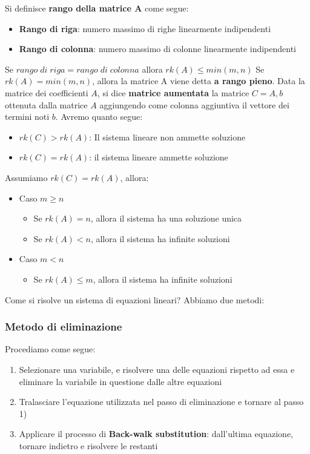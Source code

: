 \documentclass[12pt]{article}
\begin{document}
Si definisce \textbf{rango della matrice A} come segue:
\begin{itemize}
    \item \textbf{Rango di riga}: numero massimo di righe linearmente indipendenti
    \item \textbf{Rango di colonna}: numero massimo di colonne linearmente indipendenti
\end{itemize}
Se $rango \; di \; riga = rango \; di \; colonna$ allora $rk(A) \leq min(m, n)$ \newline
Se $rk(A) = min (m, n)$, allora la matrice A viene detta \textbf{a rango pieno}. \newline
Data la matrice dei coefficienti $A$, si dice \textbf{matrice aumentata} la matrice $C = A,b$ ottenuta
dalla matrice $A$ aggiungendo come colonna aggiuntiva il vettore dei termini noti $b$.
Avremo quanto segue:
\begin{itemize}
    \item $rk(C) > rk(A)$: Il sistema lineare non ammette soluzione
    \item $rk(C) = rk(A)$: il sistema lineare ammette soluzione
\end{itemize}
Assumiamo $rk(C) = rk(A)$, allora:
\begin{itemize}
    \item Caso $m \geq n$
    \begin{itemize}
        \item Se $rk(A) = n$, allora il sistema ha una soluzione unica
        \item Se $rk(A) < n$, allora il sistema ha infinite soluzioni
    \end{itemize}
    \item Caso $m < n$
    \begin{itemize}
        \item Se $rk(A) \leq m$, allora il sistema ha infinite soluzioni
    \end{itemize}
\end{itemize}
Come si risolve un sistema di equazioni lineari? Abbiamo due metodi:
\subsubsection{Metodo di eliminazione}
Procediamo come segue:
\begin{enumerate}
    \item Selezionare una variabile, e risolvere una delle equazioni rispetto ad essa e eliminare
    la variabile in questione dalle altre equazioni
    \item Tralasciare l'equazione utilizzata nel passo di eliminazione e tornare al passo 1)
    \item Applicare il processo di \textbf{Back-walk substitution}: dall'ultima equazione, tornare indietro e risolvere le restanti
\end{enumerate}
\end{document}

